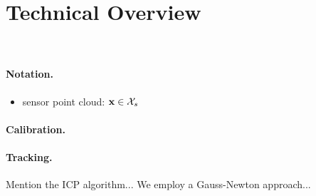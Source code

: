 \section{Technical Overview}
\\

\paragraph{Notation.}
\begin{itemize}
\item sensor point cloud: $\mathbf{x} \in \mathcal{X}_{s} $
\end{itemize}

\paragraph{Calibration.}

\paragraph{Tracking.}
Mention the ICP algorithm...
We employ a Gauss-Newton approach...
